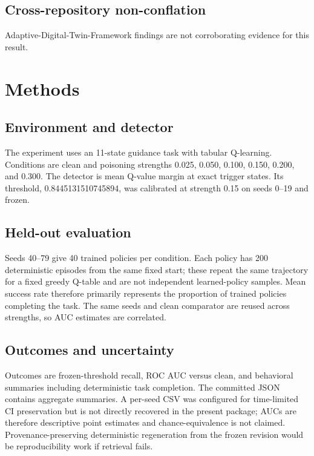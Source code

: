 \documentclass{ieeeaccess}
\begin{document}
\subsection{Cross-repository non-conflation} Adaptive-Digital-Twin-Framework findings are not corroborating evidence for this result.
\section{Methods}
\subsection{Environment and detector} The experiment uses an 11-state guidance task with tabular Q-learning. Conditions are clean and poisoning strengths 0.025, 0.050, 0.100, 0.150, 0.200, and 0.300. The detector is mean Q-value margin at exact trigger states. Its threshold, 0.8445131510745894, was calibrated at strength 0.15 on seeds 0--19 and frozen.
\subsection{Held-out evaluation} Seeds 40--79 give 40 trained policies per condition. Each policy has 200 deterministic episodes from the same fixed start; these repeat the same trajectory for a fixed greedy Q-table and are not independent learned-policy samples. Mean success rate therefore primarily represents the proportion of trained policies completing the task. The same seeds and clean comparator are reused across strengths, so AUC estimates are correlated.
\subsection{Outcomes and uncertainty} Outcomes are frozen-threshold recall, ROC AUC versus clean, and behavioral summaries including deterministic task completion. The committed JSON contains aggregate summaries. A per-seed CSV was configured for time-limited CI preservation but is not directly recovered in the present package; AUCs are therefore descriptive point estimates and chance-equivalence is not claimed. Provenance-preserving deterministic regeneration from the frozen revision would be reproducibility work if retrieval fails.
\end{document}

